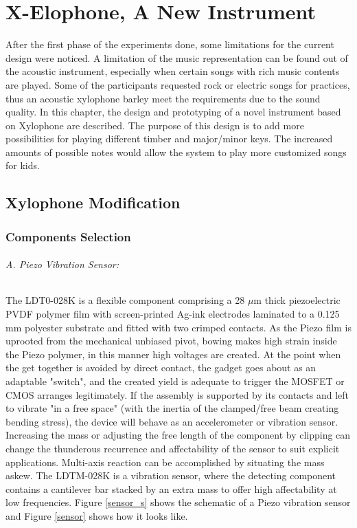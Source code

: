 \chapter{X-Elophone, A New Instrument}
After the first phase of the experiments done, some limitations for the current design were noticed.
A limitation of the music representation can be found out of the acoustic instrument, especially
when certain songs with rich music contents are played. Some of the participants requested rock or electric 
songs for practices, thus an acoustic xylophone barley meet the requirements due to the 
sound quality. In this chapter, the design and prototyping of a novel instrument based on Xylophone are described.
The purpose of this design is to add more possibilities for playing different timber and major/minor keys. 
The increased amounts of possible notes would allow the system to play more customized songs for kids.\\

\section{Xylophone Modification}

\subsection{Components Selection}

\subparagraph{A. Piezo Vibration Sensor: }
The LDT0-028K is a flexible component comprising a 28 $\mu$m thick piezoelectric PVDF
polymer film with screen-printed Ag-ink electrodes laminated to a 0.125 mm polyester 
substrate and fitted with two crimped contacts. As the Piezo film is uprooted from 
the mechanical unbiased pivot, bowing makes high strain inside the Piezo polymer, 
in this manner high voltages are created. At the point when the get together is avoided by direct 
contact, the gadget goes about as an adaptable "switch", and the created yield is adequate 
to trigger the MOSFET or CMOS arranges legitimately. If the assembly is supported by its contacts 
and left to vibrate "in a free space" (with the inertia of the clamped/free beam creating 
bending stress), the device will behave as an accelerometer or vibration sensor. Increasing 
the mass or adjusting the free length of the component by clipping can change the thunderous 
recurrence and affectability of the sensor to suit explicit applications. Multi-axis reaction 
can be accomplished by situating the mass askew. The LDTM-028K is a vibration sensor, 
where the detecting component contains a cantilever bar stacked by an extra mass to 
offer high affectability at low frequencies. Figure \ref{sensor_s} shows the schematic of 
a Piezo vibration sensor and Figure \ref{sensor} shows how it looks like.\\

